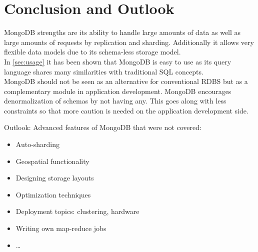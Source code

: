 
\clearpage
\section{Conclusion and Outlook}
\label{sec:conclusion}

MongoDB strengths are its ability to handle large amounts of data as well as
large amounts of requests by replication and sharding. Additionally it allows
very flexible data models due to its schema-less storage model.\\
In \autoref{sec:usage} it has been shown that MongoDB is easy to use as its
query language shares many similarities with traditional SQL concepts.\\
MongoDB should not be seen as an alternative for conventional RDBS but as a
complementary module in application development. MongoDB encourages
denormalization of schemas by not having any. This goes along with less
constraints so that more caution is needed on the application development side.

Outlook: Advanced features of MongoDB that were not covered:
\begin{itemize}
  \item Auto-sharding
  \item Geospatial functionality
  \item Designing storage layouts
  \item Optimization techniques
  \item Deployment topics: clustering, hardware
  \item Writing own map-reduce jobs
  \item \ldots
\end{itemize}



